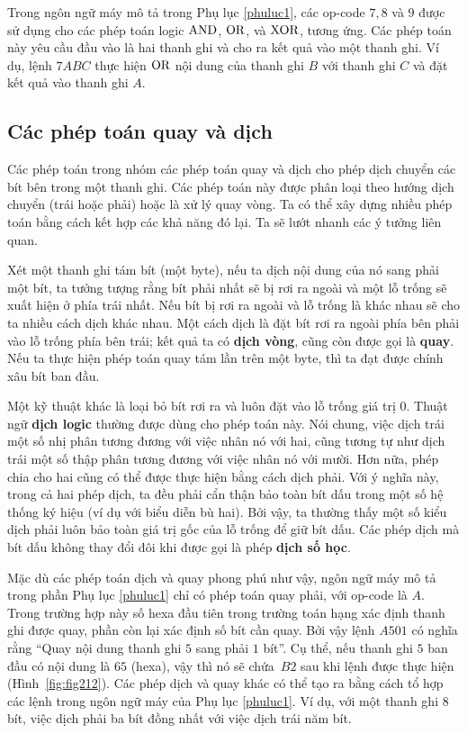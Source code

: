Trong ngôn ngữ máy mô tả trong Phụ lục \ref{phuluc1}, các op-code $7,8$ và $9$ được sử
dụng cho các phép toán logic $\operatorname{\mbox{AND}}$, $\operatorname{\mbox{OR}}$, và $\operatorname{\mbox{XOR}}$, tương ứng. Các phép toán này yêu
cầu đầu vào là hai thanh ghi và cho ra kết quả vào một thanh ghi. Ví dụ, lệnh $7ABC$ thực
hiện $\operatorname{\mbox{OR}}$ nội dung của thanh ghi $B$ với thanh ghi $C$ và đặt kết quả vào thanh ghi $A$.

\subsection*{Các phép toán quay  và dịch}
Các phép toán trong nhóm các phép toán quay và dịch cho phép dịch chuyển các bít bên trong
một thanh ghi. Các phép toán này được phân loại theo hướng dịch chuyển (trái hoặc phải)
hoặc là xử lý quay vòng. Ta có thể xây dựng nhiều phép toán bằng cách kết hợp các khả năng
đó lại. Ta sẽ lướt nhanh các ý tưởng liên quan.

Xét một thanh ghi tám bít (một byte), nếu ta dịch nội dung của nó sang phải một bít, ta
tưởng tượng rằng bít phải nhất sẽ bị rơi ra ngoài và một lỗ trống sẽ xuất hiện ở phía trái
nhất. Nếu bít bị rơi ra ngoài và lỗ trống là khác nhau sẽ cho ta nhiều cách dịch khác
nhau. Một cách dịch là đặt bít rơi ra ngoài phía bên phải vào lỗ trống phía bên trái; kết
quả ta có \textbf{dịch vòng}, cũng còn được gọi là \textbf{quay}. Nếu ta thực hiện phép
toán quay tám lần trên một byte, thì ta đạt được chính xâu bít ban đầu.

Một kỹ thuật khác là loại bỏ bít rơi ra và luôn đặt vào lỗ trống giá trị $0$. Thuật ngữ
\textbf{dịch logic} thường được dùng cho phép toán này. Nói chung, việc dịch trái một số
nhị phân tương đương với việc nhân nó với hai, cũng tương tự như dịch trái một số thập
phân tương đương với việc nhân nó với mười. Hơn nữa, phép chia cho hai cũng có thể được
thực hiện bằng cách dịch phải. Với ý nghĩa này, trong cả hai phép dịch, ta đều phải cẩn
thận bảo toàn bít dấu trong một số hệ thống ký hiệu (ví dụ với biểu diễn bù hai). Bởi vậy,
ta thường thấy một số kiểu dịch phải luôn bảo toàn giá trị gốc của lỗ trống để giữ bít
dấu. Các phép dịch mà bít dấu không thay đổi đôi khi được gọi là phép \textbf{dịch số
  học}.

Mặc dù các phép toán dịch và quay phong phú như vậy, ngôn ngữ máy mô tả trong phần Phụ lục
\ref{phuluc1} chỉ có phép toán quay phải, với op-code là $A$. Trong trường hợp này số hexa
đầu tiên trong trường toán hạng xác định thanh ghi được quay, phần còn lại xác định số bít
cần quay. Bởi vậy lệnh $A501$ có nghĩa rằng ``Quay nội dung thanh ghi $5$ sang phải $1$
bít''.  Cụ thể, nếu thanh ghi $5$ ban đầu có nội dung là $65$ (hexa), vậy thì nó sẽ
chứa~$B2$ sau khi lệnh được thực hiện (Hình~\ref{fig:fig212}).  Các phép dịch và quay khác
có thể tạo ra bằng cách tổ hợp các lệnh trong ngôn ngữ máy của Phụ lục \ref{phuluc1}. Ví
dụ, với một thanh ghi $8$ bít, việc dịch phải ba bít đồng nhất với việc dịch trái năm bít.

